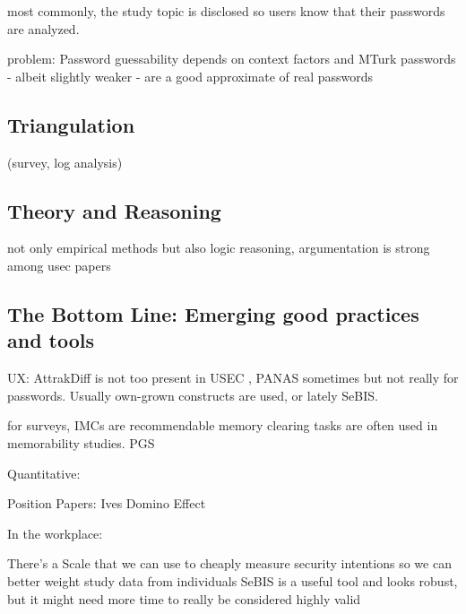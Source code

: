 most commonly, the study topic is disclosed so users know that their passwords are analyzed. 

\cite{Huha2015UserReplaceablePasswords}

problem:
Password guessability depends on context factors and MTurk passwords - albeit slightly weaker - are a good approximate of real passwords \cite{Mazurek2013Measuring}


\subsection{Triangulation}
(survey, log analysis) \cite{Wash2016UnderstandingPasswordChoices}

\subsection{Theory and Reasoning}
not only empirical methods but also logic reasoning, argumentation is strong among usec papers


\subsection{The Bottom Line: Emerging good practices and tools}

UX: AttrakDiff is not too present in USEC \cite{Hassenzahl2003AttrakDiffGerman}, PANAS sometimes \cite{Rosoff2014BehavioralExperimentsFraud} but not really for passwords. Usually own-grown constructs are used, or lately SeBIS.

for surveys, IMCs are recommendable \cite{Oppenheimer2009InstructionalManipulationChecks}
memory clearing tasks are often used in memorability studies.
PGS 


Quantitative: 


Position Papers:
Ives Domino Effect \cite{Ives2004DominoEffectReuse}

In the workplace: \cite{Adams1997MakingPWsSecureAndUsable, Inglesant2010TrueCostOfUnusablePolicies}



			
	
	There's a Scale that we can use to cheaply measure security intentions so we can better weight study data from individuals \cite{Egelman2015SeBIS}
	SeBIS is a useful tool and looks robust, but it might need more time to really be considered highly valid \cite{Egelman2016BehaviorEverFollows}

